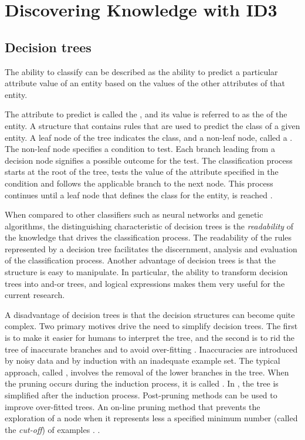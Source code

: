 
\chapter*{Discovering Knowledge with ID3}

\section{Decision trees}
\label{sec:decision_tree}   
 The ability to classify can be described as the ability to predict a particular attribute value of an entity based on the values of the other attributes of that entity.  

  The attribute to predict is called the , and its value is referred to as the  of the entity. 
 {A structure that contains rules that are used to predict the class of a given entity.  A leaf node of the tree indicates the class, and a non-leaf node, called a . The non-leaf node specifies a condition to test. Each branch leading from a decision node signifies a possible outcome for the test.  The classification process starts at the root of the tree, tests the value of the attribute specified in the condition and follows the applicable branch to the next node. This process continues until a leaf node that defines the class for the entity, is reached \cite{jackson:learning}}.

When compared to other classifiers such as neural networks and genetic algorithms, the distinguishing characteristic of decision trees is the {\sl readability} of the knowledge that drives the classification process.  The readability of the rules represented by a decision tree facilitates the discernment, analysis and evaluation of the classification process.  Another advantage of decision trees is that the structure is easy to manipulate.  In particular, the ability to transform decision trees into and-or trees, and logical expressions makes them very useful for the current research.

A disadvantage of decision trees is that the decision structures can become quite complex. Two primary motives drive the need to simplify decision trees.  The first is to make it easier for humans to interpret the tree, and the second is to rid the tree of inaccurate branches and to avoid over-fitting \cite{kubat:review}.  Inaccuracies are introduced by noisy data and by induction with an inadequate example set.  The typical approach, called  , involves the removal of the lower branches in the tree. When the pruning occurs during the induction process, it is called .  In , the tree is simplified after the induction process.  Post-pruning methods can be used to improve over-fitted trees. 
 {An on-line pruning method that prevents the exploration of a node when it represents less a specified minimum number (called the \emph{cut-off}) of examples \cite{quinlan:c45}.   }. %

